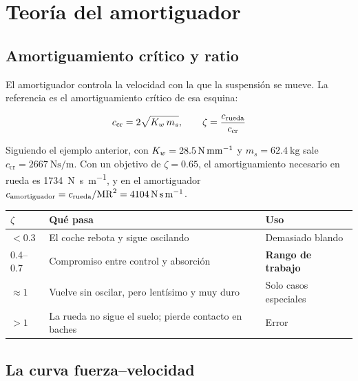 \section{Teoría del amortiguador}
\label{sec:muelles_amortiguadores:03}

\subsection{Amortiguamiento crítico y ratio}

El amortiguador controla la velocidad con la que la suspensión se mueve. La
referencia es el amortiguamiento crítico de esa esquina:

\begin{equation}
  c_{\text{cr}} = 2\sqrt{K_w\,m_s},
  \qquad
  \zeta = \frac{c_{\text{rueda}}}{c_{\text{cr}}}
  \label{eq:amortiguamiento_critico}
\end{equation}

Siguiendo el ejemplo anterior, con $K_w = \SI{28.5}{\newton\per\milli\meter}$ y
$m_s = \SI{62.4}{\kilogram}$ sale $c_{\text{cr}} = \SI{2667}{\newton\second\per\meter}$.
Con un objetivo de $\zeta = \num{0.65}$, el amortiguamiento necesario en rueda
es \SI{1734}{\newton\second\per\meter}, y en el amortiguador
$c_{\text{amortiguador}} = c_{\text{rueda}}/\mathrm{MR}^2 = \SI{4104}{\newton\second\per\meter}$.

\begin{center}
\begin{tabularx}{\textwidth}{@{}lXl@{}}
\toprule
\textbf{$\zeta$} & \textbf{Qué pasa} & \textbf{Uso} \\
\midrule
$< \num{0.3}$ & El coche rebota y sigue oscilando & Demasiado blando \\
\numrange{0.4}{0.7} & Compromiso entre control y absorción & \textbf{Rango de trabajo} \\
$\approx \num{1}$ & Vuelve sin oscilar, pero lentísimo y muy duro & Solo casos especiales \\
$> \num{1}$ & La rueda no sigue el suelo; pierde contacto en baches & Error \\
\bottomrule
\end{tabularx}
\end{center}

\subsection{La curva fuerza--velocidad}

